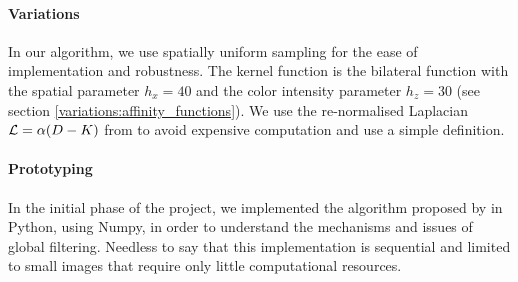 \paragraph{Variations}
In our algorithm, we use spatially uniform sampling for the ease of implementation and robustness.
The kernel function is the bilateral function with the spatial parameter \(h_x = 40\) and the color intensity parameter \(h_z = 30\) (see section \ref{variations:affinity_functions}).
We use the re-normalised Laplacian \(\operatorname{\mathcal{L}} = \alpha (D-K)\) from \cite{milanfar_new_2016} to avoid expensive computation and use a simple definition.

\paragraph{Prototyping}
In the initial phase of the project, we implemented the algorithm proposed by \cite{glide_2014} in Python, using Numpy, in order to understand the mechanisms and issues of global filtering.
Needless to say that this implementation is sequential and limited to small images that require only little computational resources.
